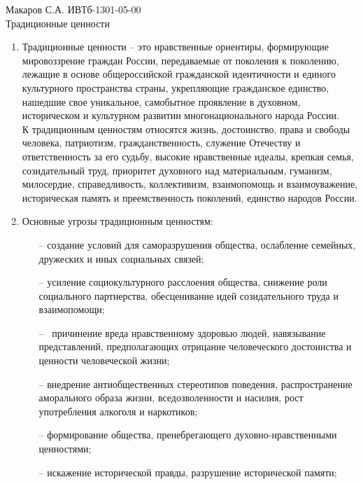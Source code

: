 \documentclass[a4paper,14pt]{extarticle}
\begin{document}
	\pagestyle{empty}
	\noindent Макаров С.А. ИВТб-1301-05-00\\
	Традиционные ценности\\
	
	\begin{enumerate}
		\item Традиционные ценности -- это нравственные ориентиры, формирующие мировоззрение граждан России, передаваемые от поколения к поколению, лежащие в основе общероссийской гражданской идентичности и единого культурного пространства страны, укрепляющие гражданское единство, нашедшие свое уникальное, самобытное проявление в духовном, историческом и культурном развитии многонационального народа России.\\
		
		К традиционным ценностям относятся жизнь, достоинство, права и свободы человека, патриотизм, гражданственность, служение Отечеству и ответственность за его судьбу, высокие нравственные идеалы, крепкая семья, созидательный труд, приоритет духовного над материальным, гуманизм, милосердие, справедливость, коллективизм, взаимопомощь и взаимоуважение, историческая память и преемственность поколений, единство народов России.
		
		\item Основные угрозы традиционным ценностям:
			\begin{itemize}
				\item[--] создание условий для саморазрушения общества, ослабление семейных, дружеских и иных социальных связей;
				
				\item[--] усиление социокультурного расслоения общества, снижение роли социального партнерства, обесценивание идей созидательного труда и взаимопомощи;
				
				\item[--]  причинение вреда нравственному здоровью людей, навязывание представлений, предполагающих отрицание человеческого достоинства и ценности человеческой жизни;
				
				\item[--] внедрение антиобщественных стереотипов поведения, распространение аморального образа жизни, вседозволенности и насилия, рост употребления алкоголя и наркотиков;
				
				\item[--] формирование общества, пренебрегающего духовно-нравственными ценностями;
				
				\item[--] искажение исторической правды, разрушение исторической памяти;
				

\end{itemize}
\end{enumerate}
\end{document}
